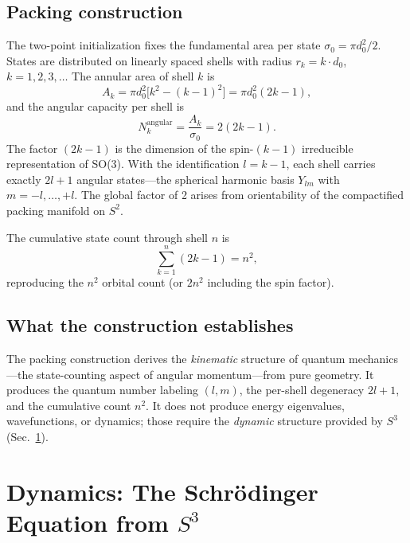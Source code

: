 \documentclass[aps,pra,twocolumn,superscriptaddress,longbibliography]{revtex4-2}
\begin{document}
\subsection{Packing construction}

The two-point initialization fixes the fundamental area per state
$\sigma_0 = \pi d_0^2 / 2$.  States are distributed on linearly
spaced shells with radius $r_k = k \cdot d_0$, $k = 1, 2, 3, \ldots$
The annular area of shell $k$ is
\begin{equation}
A_k = \pi d_0^2 \bigl[ k^2 - (k-1)^2 \bigr] = \pi d_0^2 (2k - 1),
\label{eq:annular_area}
\end{equation}
and the angular capacity per shell is
\begin{equation}
N_k^{\text{angular}} = \frac{A_k}{\sigma_0} = 2(2k - 1).
\label{eq:shell_capacity}
\end{equation}
The factor $(2k-1)$ is the dimension of the spin-$(k-1)$ irreducible
representation of SO(3).  With the identification $l = k - 1$, each
shell carries exactly $2l + 1$ angular states---the spherical harmonic
basis $Y_{lm}$ with $m = -l, \ldots, +l$.  The global factor of 2
arises from orientability of the compactified packing manifold on $S^2$.

The cumulative state count through shell $n$ is
\begin{equation}
\sum_{k=1}^{n} (2k - 1) = n^2,
\label{eq:cumulative}
\end{equation}
reproducing the $n^2$ orbital count (or $2n^2$ including the spin
factor).

\subsection{What the construction establishes}

The packing construction derives the \textit{kinematic} structure of
quantum mechanics---the state-counting aspect of angular momentum---from
pure geometry.  It produces the quantum number labeling $(l, m)$, the
per-shell degeneracy $2l+1$, and the cumulative count $n^2$.  It does
not produce energy eigenvalues, wavefunctions, or dynamics; those
require the \textit{dynamic} structure provided by $S^3$ (Sec.~\ref{sec:dynamics}).


\section{Dynamics: The Schr\"odinger Equation from $S^3$}
\label{sec:dynamics}
\end{document}
